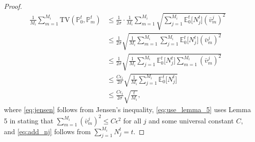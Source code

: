 \documentclass[10pt]{article}
\begin{document}
\begin{proof}
\begin{align}
        \frac{1}{M_i}\sum_{m=1}^{M_i}\mathrm{TV}(\mathbb{P}_0^{t}, \mathbb{P}_m^{t})
        & \leq \frac{1}{2\sigma}\cdot\frac{1}{M_i}\sum_{m=1}^{M_i}\sqrt{\sum_{j=1}^{M_i} \mathbb{E}_0^{t} \bigl[ N^{t}_j \bigr] (\bar{v}^j_m)^2} \\
        & \leq \frac{1}{2\sigma} \sqrt{\frac{1}{M_i}\sum_{m=1}^{M_i} \sum_{j=1}^{M_i} \mathbb{E}_0^{t} \bigl[ N^{t}_j \bigr] (\bar{v}^j_m)^2} \label{eq:jensen} \\
        & \leq \frac{1}{2\sigma} \sqrt{\frac{1}{M_i} \sum_{j=1}^{M_i} \mathbb{E}_0^{t} \bigl[ N^{t}_j \bigr] \sum_{m=1}^{M_i} (\bar{v}^j_m)^2} \\
        & \leq \frac{C\epsilon_i}{2\sigma} \sqrt{\frac{1}{M_i} \sum_{j=1}^{M_i} \mathbb{E}_0^{t} \bigl[ N^{t}_j \bigr]} \label{eq:use_lemma_5} \\
        & \leq \frac{C\epsilon_i}{2\sigma} \sqrt{\frac{t}{M_i}} \label{eq:add_nj},
    \end{align}
    where \eqref{eq:jensen} follows from Jensen's inequality, \eqref{eq:use_lemma_5} uses Lemma 5 in \citep{Scarlett17} stating that $\sum_{m=1}^{M_i} (\bar{v}^j_m)^2 \leq C \epsilon^2$ for all $j$ and some universal constant $C$, and \eqref{eq:add_nj} follows from $\sum_{j=1}^{M_i} N^{t}_j = t$.
\end{proof}
\end{document}
